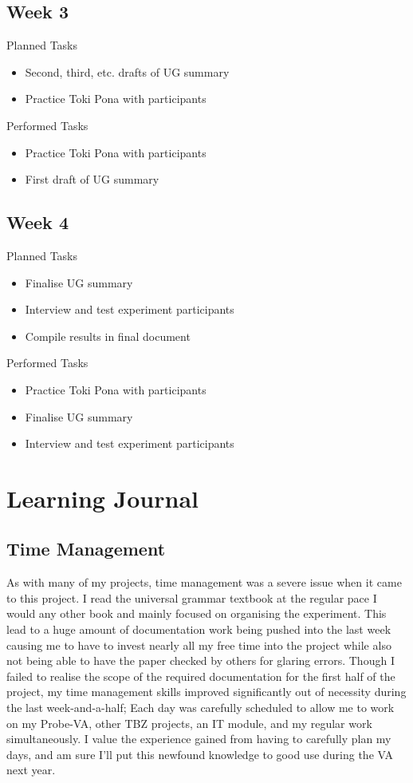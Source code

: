 \documentclass[a4paper,10pt]{article}
\begin{document}
\subsection{Week 3}
\large{Planned Tasks}
\begin{itemize}
	\item Second, third, etc. drafts of UG summary
	\item Practice Toki Pona with participants
\end{itemize}
\large{Performed Tasks}
\begin{itemize}
	\item Practice Toki Pona with participants
	\item First draft of UG summary
\end{itemize}
\subsection{Week 4}
\large{Planned Tasks}
\begin{itemize}
	\item Finalise UG summary
	\item Interview and test experiment participants
	\item Compile results in final document
\end{itemize}
\large{Performed Tasks}
\begin{itemize}
	\item Practice Toki Pona with participants
	\item Finalise UG summary
	\item Interview and test experiment participants
\end{itemize}


\section{Learning Journal} %
\subsection{Time Management}
As with many of my projects, time management was a severe issue when it came to this project. I read
the universal grammar textbook at the regular pace I would any other book and mainly focused on
organising the experiment. This lead to a huge amount of documentation work being pushed into the
last week causing me to have to invest nearly all my free time into the project while also not being
able to have the paper checked by others for glaring errors. Though I failed to realise the scope
of the required documentation for the first half of the project, my time management skills improved
significantly out of necessity during the last week-and-a-half; Each day was carefully scheduled to
allow me to work on my Probe-VA, other TBZ projects, an IT module, and my regular work simultaneously.
I value the experience gained from having to carefully plan my days, and am sure I'll put this newfound
knowledge to good use during the VA next year.
\end{document}
